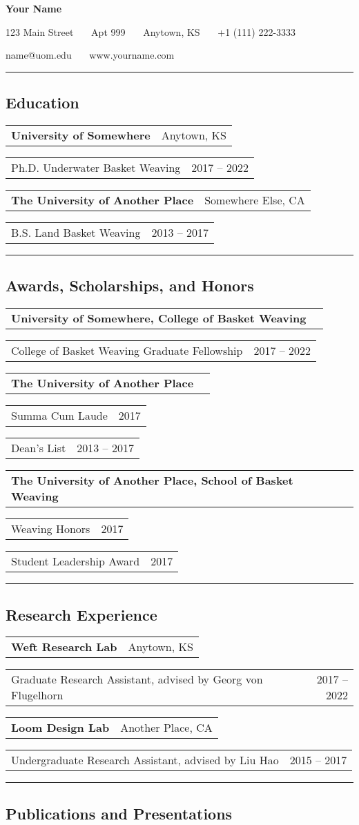 \documentclass[10pt,letterpaper]{article}
\makeatletter
\newlength{\step}
\newlength{\aligngroupinlen}
\newcommand{\aligngroup}[2]
{\begin{tabular*}{\linewidth}{@{}l@{\extracolsep{\fill}}r@{}}
		#1 &
		#2 \\
\end{tabular*}}
\newcommand{\aligngroupin}[2]
{\setlength{\aligngroupinlen}{\linewidth}\addtolength{\aligngroupinlen}{-\step}\hspace*{\step}\begin{tabular*}{\aligngroupinlen}{@{}l@{\extracolsep{\fill}}r@{}}
		#1 &
		#2 \\
\end{tabular*}}
\newenvironment{indentsection}%
	{\begin{list}%
			{}%
			{\setlength{\leftmargin}{\step}%
			 \setlength{\parsep}{\parskip}%
			 \setlength{\itemsep}{0pt}%
			}%
			\item[]%
	}%
	{\end{list}}%
\makeatother
\begin{document}
\begin{center}
{\LARGE \textbf{Your Name}}

123 Main Street \ \textbullet \ \
Apt 999 \ \textbullet \ \
Anytown, KS \ \textbullet \ \
+1 (111) 222-3333

name@uom.edu \ \textbullet \ \ 
www.yourname.com
\end{center}
\hrule
\subsection*{Education}
\begin{indentsection}
		\aligngroup
			{\textbf{University of Somewhere}}
			{Anytown, KS}
		\aligngroupin
			{Ph.D. Underwater Basket Weaving}
			{2017 -- 2022}
		\aligngroup
			{\textbf{The University of Another Place}}
			{Somewhere Else, CA}
		\aligngroupin
			{B.S. Land Basket Weaving}
			{2013 -- 2017}
\end{indentsection}
\hrule
\subsection*{Awards, Scholarships, and Honors}
\begin{indentsection}
	\aligngroup
		{\textbf{University of Somewhere, College of Basket Weaving}}
		{}
	\aligngroupin
		{College of Basket Weaving Graduate Fellowship}
		{2017 -- 2022}
	\aligngroup
		{\textbf{The University of Another Place}}
		{}
	\aligngroupin
		{Summa Cum Laude}
		{2017}
	\aligngroupin
		{Dean's List}
		{2013 -- 2017}
	\aligngroup
		{\textbf{The University of Another Place, School of Basket Weaving}}
		{}
	\aligngroupin
		{Weaving Honors}
		{2017}
	\aligngroupin
		{Student Leadership Award}
		{2017}
\end{indentsection}
\hrule
\subsection*{Research Experience}
\begin{indentsection}
	\aligngroup
		{\textbf{Weft Research Lab}}
		{Anytown, KS}
	\aligngroupin
		{Graduate Research Assistant, advised by Georg von Flugelhorn}
		{2017 -- 2022}
	\aligngroup
		{\textbf{Loom Design Lab}}
		{Another Place, CA}
	\aligngroupin
		{Undergraduate Research Assistant, advised by Liu Hao}
		{2015 -- 2017}
\end{indentsection}
\hrule
\subsection*{Publications and Presentations}
\end{document}
